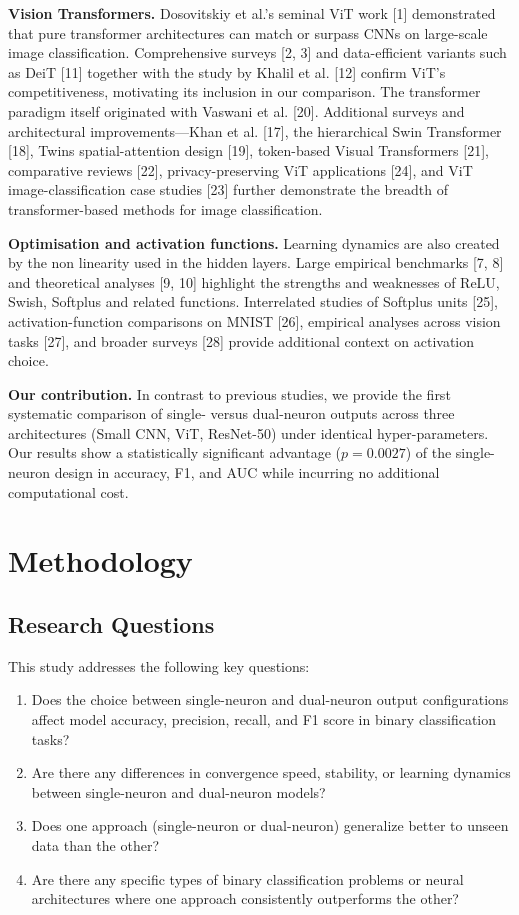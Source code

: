 \documentclass[11pt]{article}
\begin{document}
\textbf{Vision Transformers.} Dosovitskiy et al.'s seminal ViT work [1] demonstrated that pure transformer architectures can match or surpass CNNs on large-scale image classification. Comprehensive surveys [2, 3] and data-efficient variants such as DeiT [11] together with the study by Khalil et al. [12] confirm ViT's competitiveness, motivating its inclusion in our comparison. The transformer paradigm itself originated with Vaswani et al. [20]. Additional surveys and architectural improvements—Khan et al. [17], the hierarchical Swin Transformer [18], Twins spatial-attention design [19], token-based Visual Transformers [21], comparative reviews [22], privacy-preserving ViT applications [24], and ViT image-classification case studies [23] further demonstrate the breadth of transformer-based methods for image classification.

\textbf{Optimisation and activation functions.} Learning dynamics are also created by the non linearity used in the hidden layers. Large empirical benchmarks [7, 8] and theoretical analyses [9, 10] highlight the strengths and weaknesses of ReLU, Swish, Softplus and related functions. Interrelated studies of Softplus units [25], activation-function comparisons on MNIST [26], empirical analyses across vision tasks [27], and broader surveys [28] provide additional context on activation choice.



\textbf{Our contribution.}  In contrast to previous studies, we provide the first systematic comparison of single- versus dual-neuron outputs across three architectures (Small CNN, ViT, ResNet-50) under identical hyper-parameters. Our results show a statistically significant advantage ($p = 0.0027$) of the single-neuron design in accuracy, F1, and AUC while incurring no additional computational cost.

\section{Methodology}
\subsection{Research Questions}
This study addresses the following key questions:
\begin{enumerate}
\item Does the choice between single-neuron and dual-neuron output configurations affect model accuracy, precision, recall, and F1 score in binary classification tasks?
\item Are there any differences in convergence speed, stability, or learning dynamics between single-neuron and dual-neuron models?
\item Does one approach (single-neuron or dual-neuron) generalize better to unseen data than the other?
\item Are there any specific types of binary classification problems or neural architectures where one approach consistently outperforms the other?
\end{enumerate}
\end{document}
